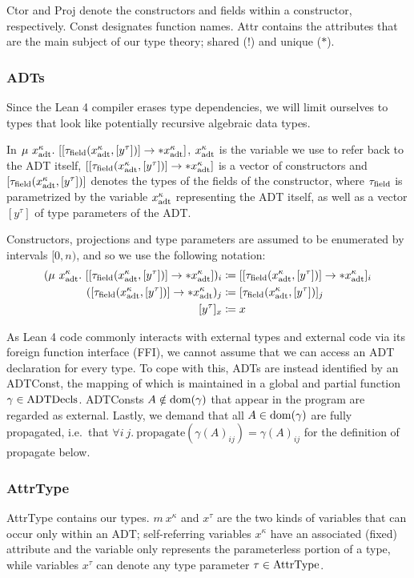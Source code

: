 Ctor and Proj denote the constructors and fields within a constructor, respectively. Const designates function names. Attr contains the attributes that are the main subject of our type theory; shared (!) and unique ($*$). 

\pagebreak %
\subsubsection{ADTs}
Since the Lean 4 compiler erases type dependencies, we will limit ourselves to types that look like potentially recursive algebraic data types. 

\sloppy In $\mu\ x^\kappa_\adt.\ [[\tau_\field(x^\kappa_\adt, [y^\tau])] \to *x^\kappa_\adt]$, $x^\kappa_{\mathrm{adt}}$ is the variable we use to refer back to the ADT itself, $[[\tau_{\mathrm{field}}(x^\kappa_{\mathrm{adt}}, [y^\tau])] \to *x^\kappa_{\mathrm{adt}}]$ is a vector of constructors and $[\tau_{\mathrm{field}}(x^\kappa_{\mathrm{adt}}, [y^\tau])]$ denotes the types of the fields of the constructor, where $\tau_{\mathrm{field}}$ is parametrized by the variable $x^\kappa_{\mathrm{adt}}$ representing the ADT itself, as well as a vector $[y^\tau]$ of type parameters of the ADT. 

Constructors, projections and type parameters are assumed to be enumerated by intervals $[0, n)$, and so we use the following notation:
\begin{align*}
	(\mu\ x^\kappa_{\mathrm{adt}}.\ [[\tau_{\mathrm{field}}(x^\kappa_{\mathrm{adt}}, [y^\tau])] \to *x^\kappa_{\mathrm{adt}}])_i &\coloneqq [[\tau_{\mathrm{field}}(x^\kappa_{\mathrm{adt}}, [y^\tau])] \to *x^\kappa_{\mathrm{adt}}]_i \\
	([\tau_{\mathrm{field}}(x^\kappa_{\mathrm{adt}}, [y^\tau])] \to *x^\kappa_{\mathrm{adt}})_j &\coloneqq [\tau_{\mathrm{field}}(x^\kappa_{\mathrm{adt}}, [y^\tau])]_j \\
	[y^\tau]_x &\coloneqq x
\end{align*}

As Lean 4 code commonly interacts with external types and external code via its foreign function interface (FFI), we cannot assume that we can access an ADT declaration for every type. To cope with this, ADTs are instead identified by an ADTConst, the mapping of which is maintained in a global and partial function $\gamma \in \mathrm{ADTDecls}$. ADTConsts $A \notin \mathrm{dom}(\gamma)$ that appear in the program are regarded as external. Lastly, we demand that all $A \in \mathrm{dom}(\gamma)$ are fully propagated, i.e.\ that $\forall i\ j.\ \mathrm{propagate}(\gamma(A)_{ij}) = \gamma(A)_{ij}$ for the definition of propagate below.

\subsubsection{AttrType}
AttrType contains our types. $m\ x^\kappa$ and $x^\tau$ are the two kinds of variables that can occur only within an ADT; self-referring variables $x^\kappa$ have an associated (fixed) attribute and the variable only represents the parameterless portion of a type, while variables $x^\tau$ can denote any type parameter $\tau \in \mathrm{AttrType}$. 

